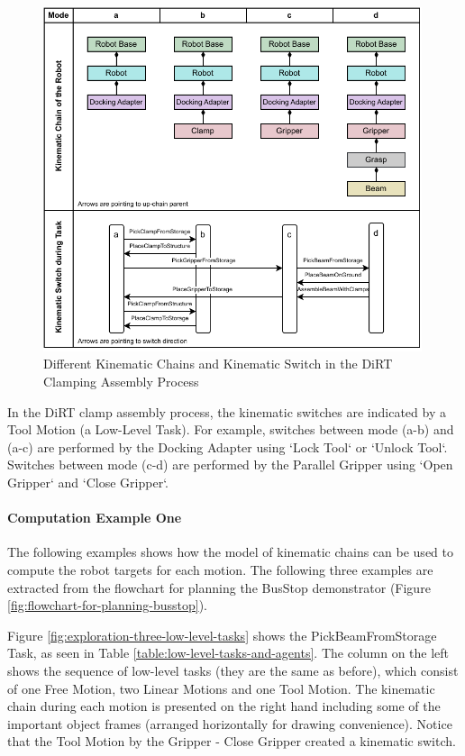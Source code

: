 \begin{figure}[!h]
    \centering
    \includegraphics[width=0.99\textwidth]{images/6a/kinematic-chain.pdf}
    \caption{Different Kinematic Chains and Kinematic Switch in the DiRT Clamping Assembly Process}
    \label{fig:kinematic-chain-arrangements}
\end{figure}

In the DiRT clamp assembly process, the kinematic switches are indicated by a Tool Motion (a Low-Level Task). For example, switches between mode (a-b) and (a-c) are performed by the Docking Adapter using `Lock Tool` or `Unlock Tool`. Switches between mode (c-d) are performed by the Parallel Gripper using `Open Gripper` and `Close Gripper`.

\FloatBarrier

\paragraph{Computation Example One}

The following examples shows how the model of kinematic chains can be used to compute the robot targets for each motion. The following three examples are extracted from the flowchart for planning the BusStop demonstrator (Figure \ref{fig:flowchart-for-planning-busstop}).

Figure \ref{fig:exploration-three-low-level-tasks} shows the PickBeamFromStorage Task, as seen in Table \ref{table:low-level-tasks-and-agents}. The column on the left shows the sequence of low-level tasks (they are the same as before), which consist of one Free Motion, two Linear Motions and one Tool Motion. The kinematic chain during each motion is presented on the right hand including some of the important object frames (arranged horizontally for drawing convenience). Notice that the Tool Motion by the Gripper - Close Gripper created a kinematic switch. 

